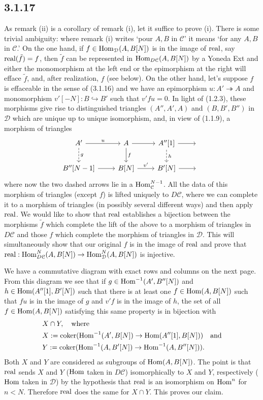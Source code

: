 \documentclass[deligne.tex]{subfiles}
\begin{document}
\subsection*{3.1.17} As remark (ii) is a corollary of remark (i), let it
suffice to prove (i). There is some trivial ambiguity: where remark (i)
writes `pour $A,B$ in $\mathcal C$' it means `for any $A,B$ in
$\mathcal C$.' On the one hand, if $f\in\operatorname{Hom}_{\mathcal D}(A,B[N])$
is in the image of $\operatorname{real}$, say $\operatorname{real}(\tilde f)=f$, then $\tilde f$ can
be represented in $\operatorname{Hom}_{D\mathcal C}(A,B[N])$ by a Yoneda Ext
and either the monomorphism at the left end or the epimorphism at the right
will efface $\tilde f$, and, after realization, $f$ (see below).
On the other hand,
let's suppose $f$ is effaceable in the sense of (3.1.16) and we have an
epimorphism $u:A'\twoheadrightarrow A$ and monomorphism
$v'[-N]:B\hookrightarrow B'$ such that $v'fu=0$.
In light of (1.2.3), these morphisms give rise to distinguished triangles
$(A'',A',A)$ and $(B,B',B'')$ in $\mathcal D$ which are unique up to unique
isomorphism, and, in view of (1.1.9), a morphism of triangles
\begin{equation*}\begin{tikzcd}
	A'\arrow[r,"u"]\arrow[d,dashed,"g"]
	&A\arrow[r]\arrow[d,"f"]
	&A''[1]\arrow[r]\arrow[d,dashed,"h"]&\; \\
	B''[N-1]\arrow[r]&B[N]\arrow[r,"v'"]&B'[N]\arrow[r]&\;
\end{tikzcd}\end{equation*}
where now the two dashed arrows lie in a $\operatorname{Hom}^{N-1}_{\mathcal C}$.
All the data of this morphism of triangles (except $f$) is lifted uniquely
to $D\mathcal C$, where we can complete it to a morphism of triangles
(in possibly several different ways) and then apply $\operatorname{real}$. We would like
to show that $\operatorname{real}$ establishes a bijection between the morphisms
$\tilde f$ which complete the lift of the above to a morphism of triangles
in $D\mathcal C$ and those $f$ which complete the morphism of triangles in
$\mathcal D$. This will simultaneously show that our original $f$ is in the
image of $\operatorname{real}$ and prove that
$\operatorname{real}:\operatorname{Hom}^N_{D\mathcal C}(A,B[N])\rightarrow\operatorname{Hom}^N_{\mathcal D}(A,B[N])$ is
injective.

We have a commutative diagram with exact rows and columns on the next page.
From this diagram we see that if $g\in\operatorname{Hom}^{-1}(A',B''[N])$ and
$h\in\operatorname{Hom}(A''[1],B'[N])$ such that there is at least one $f\in\operatorname{Hom}(A,B[N])$
such that $fu$ is in the image of $g$ and $v'f$ is in the image of $h$, the
set of all $f\in\operatorname{Hom}(A,B[N])$ satisfying this same property is in bijection
with
\begin{align*}
	&X\cap Y,\quad\text{where} \\
	&X:=\operatorname{coker}(\operatorname{Hom}^{-1}(A',B[N])\rightarrow\operatorname{Hom}(A''[1],B[N]))\quad\text{and} \\
	&Y:=\operatorname{coker}(\operatorname{Hom}^{-1}(A,B'[N])\rightarrow\operatorname{Hom}^{-1}(A,B''[N])).
\end{align*}
Both $X$ and $Y$ are considered as subgroups of $\operatorname{Hom}(A,B[N])$.
The point is that $\operatorname{real}$ sends $X$ and $Y$ ($\operatorname{Hom}$ taken in $D\mathcal C$)
isomorphically to $X$ and $Y$, respectively ($\operatorname{Hom}$ taken in $\mathcal D$)
by the hypothesis that $\operatorname{real}$ is an isomorphism on $\operatorname{Hom}^n$ for $n<N$.
Therefore $\operatorname{real}$ does the same for $X\cap Y$. This proves our claim.
\end{document}
